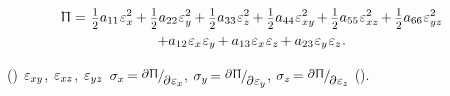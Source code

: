\nopagebreak\vspace{-0.25em}\begin{multline*}
\potentialenergydensity =^{\mathstrut^{\mathstrut}}
\smalldisplaystyleonehalf a_{11} \infinitesimaldeformationcomponents{x}^2 \hspace{-0.1ex} +
\smalldisplaystyleonehalf a_{22} \infinitesimaldeformationcomponents{y}^2 \hspace{-0.1ex} +
\smalldisplaystyleonehalf a_{33} \infinitesimaldeformationcomponents{z}^2 \hspace{-0.1ex} +
\smalldisplaystyleonehalf a_{44} \infinitesimaldeformationcomponents{xy}^2 \hspace{-0.2ex} +
\smalldisplaystyleonehalf a_{55} \infinitesimaldeformationcomponents{xz}^2 \hspace{-0.2ex} +
\smalldisplaystyleonehalf a_{66} \infinitesimaldeformationcomponents{yz}^2
\\[-0.1em]
%
+ a_{12} \infinitesimaldeformationcomponents{x} \infinitesimaldeformationcomponents{y} \hspace{-0.2ex}
+ a_{13} \infinitesimaldeformationcomponents{x} \infinitesimaldeformationcomponents{z} \hspace{-0.2ex}
+ a_{23} \infinitesimaldeformationcomponents{y} \infinitesimaldeformationcomponents{z}
\hspace{.1ex}
.
\end{multline*}

\en{,}
~()
$\hspace{.123ex}\varepsilon_{xy}$,
$\hspace{.123ex}\varepsilon_{xz}$,
$\hspace{.123ex}\varepsilon_{yz}$
${
   \sigma_x \hspace{-0.25ex}
   = \raisemath{.16em} {
      \scalebox{.88}{$ \partial \hspace{.1ex} \potentialenergydensity $}
   }
   \hspace{-0.1ex} / \hspace{-0.2ex}
   \raisemath{-0.32em} {
      \scalebox{.88}{$ \partial \infinitesimaldeformationcomponents{x} $}
   }
}$,
${
   \sigma_y \hspace{-0.25ex}
   = \raisemath{.16em} {
      \scalebox{.88}{$ \partial \hspace{.1ex} \potentialenergydensity $}
}
\hspace{-0.1ex} / \hspace{-0.2ex}
\raisemath{-0.32em} {
   \scalebox{.88}{$ \partial \infinitesimaldeformationcomponents{y} $}
}
}$,
${\sigma_z \hspace{-0.25ex}
   =
   \raisemath{.16em} {
      \scalebox{.88}{$ \partial \hspace{.1ex} \potentialenergydensity $}
   }
   \hspace{-0.1ex} / \hspace{-0.2ex} \raisemath{-0.32em} {
      \scalebox{.88}{$ \partial \infinitesimaldeformationcomponents{z} $}
  }
}$ ().

